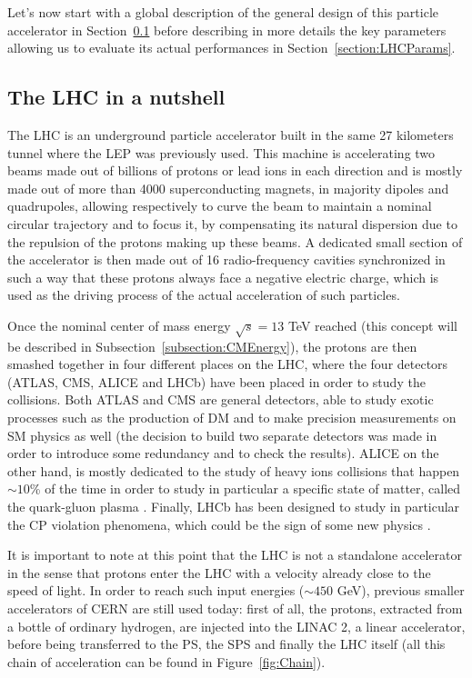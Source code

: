 \documentclass[a4paper, 10pt, openright]{report}
\begin{document}
Let's now start with a global description of the general design of this particle accelerator in Section~\ref{section:LHCNut} before describing in more details the key parameters allowing us to evaluate its actual performances in Section~\ref{section:LHCParams}.

\subsection{The \ac{LHC} in a nutshell}\label{section:LHCNut}

The \ac{LHC} is an underground particle accelerator built in the same 27 kilometers tunnel where the \ac{LEP} was previously used. This machine is accelerating two beams made out of billions of protons or lead ions in each direction and is mostly made out of more than 4000 superconducting magnets, in majority dipoles and quadrupoles, allowing respectively to curve the beam to maintain a nominal circular trajectory and to focus it, by compensating its natural dispersion due to the repulsion of the protons making up these beams. A dedicated small section of the accelerator is then made out of 16 radio-frequency cavities synchronized in such a way that these protons always face a negative electric charge, which is used as the driving process of the actual acceleration of such particles.

Once the nominal center of mass energy $\sqrt{s} = 13$ TeV reached (this concept will be described in Subsection~\ref{subsection:CMEnergy}), the protons are then smashed together in four different places on the \ac{LHC}, where the four detectors (\ac{ATLAS}, \ac{CMS}, \ac{ALICE} and LHCb) have been placed in order to study the collisions. Both \ac{ATLAS} and \ac{CMS} are general detectors, able to study exotic processes such as the production of \ac{DM} and to make precision measurements on \ac{SM} physics as well (the decision to build two separate detectors was made in order to introduce some redundancy and to check the results). \ac{ALICE} on the other hand, is mostly dedicated to the study of heavy ions collisions that happen $\sim 10$\% of the time in order to study in particular a specific state of matter, called the quark-gluon plasma \cite{ALICE}. Finally, LHCb has been designed to study in particular the CP violation phenomena, which could be the sign of some new physics \cite{LHCb}.

It is important to note at this point that the \ac{LHC} is not a standalone accelerator in the sense that protons enter the \ac{LHC} with a velocity already close to the speed of light. In order to reach such input energies ($\sim 450$ GeV), previous smaller accelerators of \ac{CERN} are still used today: first of all, the protons, extracted from a bottle of ordinary hydrogen, are injected into the LINAC 2, a linear accelerator, before being transferred to the \ac{PS}, the \ac{SPS} and finally the \ac{LHC} itself (all this chain of acceleration can be found in Figure~\ref{fig:Chain}).
\end{document}
